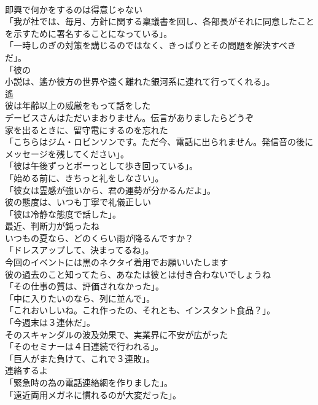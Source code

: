 \documentclass[8pt]{extreport}
\begin{document}
\begin{CJK}{UTF8}{min}
\\	即興で何かをするのは得意じゃない	
\\	「我が社では、毎月、方針に関する稟議書を回し、各部長がそれに同意したことを示すために署名することになっている」。	
\\	「一時しのぎの対策を講じるのではなく、きっぱりとその問題を解決すべきだ」。	
\\	「彼の
\\	小説は、遙か彼方の世界や遠く離れた銀河系に連れて行ってくれる」。	
\\	遙
\\	彼は年齢以上の威厳をもって話をした	
\\	デービスさんはただいまおりません。伝言がありましたらどうぞ	
\\	家を出るときに、留守電にするのを忘れた	
\\	「こちらはジム・ロビンソンです。ただ今、電話に出られません。発信音の後にメッセージを残してください」。	
\\	「彼は午後ずっとボーっとして歩き回っている」。	
\\	「始める前に、きちっと礼をしなさい」。	
\\	「彼女は霊感が強いから、君の運勢が分かるんだよ」。	
\\	彼の態度は、いつも丁寧で礼儀正しい	
\\	「彼は冷静な態度で話した」。	
\\	最近、判断力が鈍ったね	
\\	いつもの夏なら、どのくらい雨が降るんですか？	
\\	「ドレスアップして、決まってるね」。	
\\	今回のイベントには黒のネクタイ着用でお願いいたします	
\\	彼の過去のこと知ってたら、あなたは彼とは付き合わないでしょうね	
\\	「その仕事の質は、評価されなかった」。	
\\	「中に入りたいのなら、列に並んで」。	
\\	「これおいしいね。これ作ったの、それとも、インスタント食品？」。	
\\	「今週末は３連休だ」。	
\\	そのスキャンダルの波及効果で、実業界に不安が広がった	
\\	「そのセミナーは４日連続で行われる」。	
\\	「巨人がまた負けて、これで３連敗」。	
\\	連絡するよ	
\\	「緊急時の為の電話連絡網を作りました」。	
\\	「遠近両用メガネに慣れるのが大変だった」。	

\end{CJK}
\end{document}
